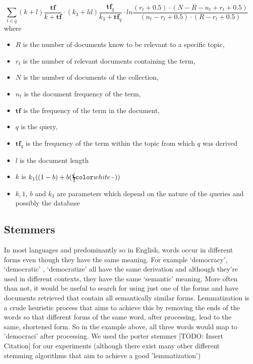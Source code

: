 \begin{equation}
 \sum\limits_{t \in q} (k+l)\frac{\bm{tf}}{k+\bm{tf}} \cdot (k_3+ld) \frac{\bm{tf}_q}{k_3 + \bm{tf}_q} \cdot ln\frac{ (r_t +0.5) \cdot (N-R-n_t+r_t+0.5) }{(n_t-r_t+0.5) \cdot (R-r_t+0.5)}
\end{equation}
where
\begin{itemize}
\item $R$ is the number of documents know to be relevant to a specific topic,
\item $r_t$ is the number of relevant documents containing the term,
\item $N$ is the number of documents of the collection, 
\item $n_t$ is the document frequency of the term,
\item $\bm{tf}$ is the frequency of the term in the document,
\item $q$ is the query,
\item $\bm{tf}_q$ is the frequency of the term within the topic from which $q$ was derived
\item $l$ is the document length
\item $k$ is $k_1( ( 1-b ) + b( \Tfrac{l}{1} ) )$
\item $k,1$, $b$ and $k_3$ are parameters which depend on the nature of the queries and possibly the database

\end{itemize}



\subsection{Stemmers}

In most languages and predominantly so in English, words occur in different forms even though they have the same meaning. For example \lq democracy', \lq democratic' , \lq democratize' all have the same derivation and although they're used in different contexts, they have the same \lq semantic' meaning. More often than not, it would be useful to search for using just one of the forms and have documents retrieved that contain all semantically similar forms. Lemmatization is a crude heuristic process that aims to achieve this by removing the ends of the words so that different forms of the same word, after processing, lead to the same, shortened form. So in the example above, all three words would map to ’democraci’ after processing. We used the porter stemmer [TODO: Insert Citation] for our experiments (although there exist many other different stemming algorithms that aim to achieve a good ’lemmatization’)

